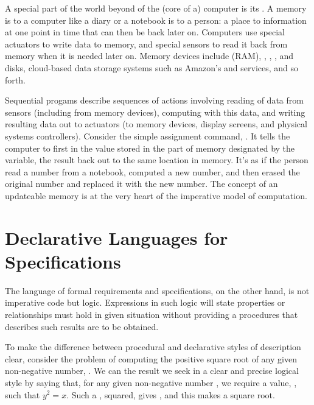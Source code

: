 \documentclass[letterpaper,10pt,english]{sphinxmanual}
\begin{document}
A special part of the world beyond of the (core of a) computer is its
. A memory is to a computer like a diary or a notebook is to a
person: a place to  information at one point in time that can
then be  back later on. Computers use special actuators to write
data to memory, and special sensors to read it back from memory when
it is needed later on. Memory devices include 
(RAM), , , ,  and
 disks, cloud-based data storage systems such as Amazon’s 
and  services, and so forth.

Sequential progams describe sequences of actions involving reading of
data from sensors (including from memory devices), computing with this
data, and writing resulting data out to actuators (to memory devices,
display screens, and physical systems controllers). Consider the
simple assignment command, . It tells the computer to
first  in the value stored in the part of memory designated by
the variable,  the
result back out to the same location in memory. It’s as if the person
read a number from a notebook, computed a new number, and then erased
the original number and replaced it with the new number. The concept
of an updateable memory is at the very heart of the imperative model
of computation.


\section{Declarative Languages for Specifications}
\label{\detokenize{02-logic-and-code:declarative-languages-for-specifications}}
The language of formal requirements and specifications, on the other
hand, is not imperative code but  logic.  Expressions in
such logic will state  properties or relationships must hold in
given situation without providing a procedures that describes 
such results are to be obtained.

To make the difference between procedural and declarative styles of
description clear, consider the problem of computing the positive
square root of any given non-negative number, . We can 
the result we seek in a clear and precise logical style by saying
that, for any given non-negative number , we require a value, ,
such that \(y^2 = x\). Such a , squared, gives , and this
makes  a square root.
\end{document}
